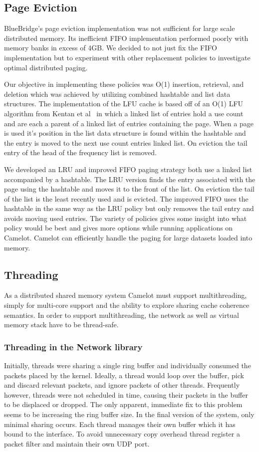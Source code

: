 \subsection{Page Eviction} 

BlueBridge's page eviction implementation was not sufficient for large scale
distributed memory. Its inefficient FIFO implementation performed poorly with
memory banks in excess of 4GB. We decided to not just fix the FIFO
implementation but to experiment with other replacement policies to investigate
optimal distributed paging. 

Our objective in implementing these policies was
O(1) insertion, retrieval, and deletion which was achieved by utilizing
combined hashtable and list data structures. The implementation of the LFU
cache is based off of an O(1) LFU algorithm from Kentan et
al~\cite{Ketan10ano(1)} in which a linked list of entries hold a use count and
are each a parent of a linked list of entries containing the page. When a page is
used it's position in the list data structure is found within the hashtable and
the entry is moved to the next use count entries linked list. On eviction the
tail entry of the head of the frequency list is removed.

We developed an LRU and improved FIFO paging strategy both use a linked list
accompanied by a hashtable. The LRU version finds the entry associated with the
page using the hashtable and moves it to the front of the list. On eviction the
tail of the list is the least recently used and is evicted. The improved FIFO
uses the hashtable in the same way as the LRU policy but only removes the tail
entry and avoids moving used entries. The variety of policies gives some insight
into what policy would be best and gives more options while running
applications on Camelot. Camelot can efficiently handle the paging for large
datasets loaded into memory.

\subsection{Threading} 
As a distributed shared memory system Camelot must support multithreading, simply for multi-core support and the ability to explore sharing cache coherence semantics.
In order to support multithreading, the network as well as virtual memory stack have to be thread-safe.
\subsubsection{Threading in the Network library}
Initially, threads were sharing a single ring buffer and individually consumed the packets placed by the kernel. Ideally, a thread would loop over the buffer, pick and discard relevant packets, and ignore packets of other threads. Frequently however, threads were not scheduled in time, causing their packets in the buffer to be displaced or dropped. The only apparent, immediate fix to this problem seems to be increasing the ring buffer size.
In the final version of the system, only minimal sharing occurs. Each thread manages their own buffer which it has bound to the interface. To avoid unnecessary copy overhead thread register a packet filter and maintain their own UDP port.


